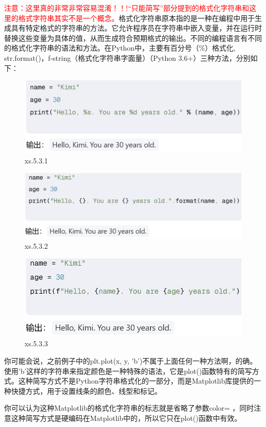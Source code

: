\documentclass[12pt]{article}
\begin{document}
\noindent \textcolor{red}{注意：这里真的非常非常容易混淆！！!“只能简写”部分提到的格式化字符串和这里的格式字符串其实不是一个概念。}格式化字符串原本指的是一种在编程中用于生成具有特定格式的字符串的方法。它允许程序员在字符串中嵌入变量，并在运行时替换这些变量为具体的值，从而生成符合预期格式的输出。不同的编程语言有不同的格式化字符串的语法和方法。在Python中，主要有百分号（\%）格式化, str.format()，f-string（格式化字符串字面量）（Python 3.6+）三种方法，分别如下：
\begin{figure}[H]
    \centering
    \includegraphics[width=0.75\linewidth]{格式化字符串1.png}
    \caption{xs.5.3.1}
    \label{fig:enter-label}
\end{figure}
\begin{figure}[H]
    \centering
    \includegraphics[width=0.75\linewidth]{格式化字符串2.png}
    \caption{xs.5.3.2}
    \label{fig:enter-label}
\end{figure}
\begin{figure}[H]
    \centering
    \includegraphics[width=0.75\linewidth]{格式化字符串3.png}
    \caption{xs.5.3.3}
    \label{fig:enter-label}
\end{figure}
你可能会说，之前例子中的plt.plot(x, y, 'b')不属于上面任何一种方法啊，的确。使用'b'这样的字符串来指定颜色是一种特殊的语法，它是plot()函数特有的简写方式。这种简写方式不是Python字符串格式化的一部分，而是Matplotlib库提供的一种快捷方式，用于设置线条的颜色、线型和标记。

你可以认为这种Matplotlib的格式化字符串的标志就是省略了参数color= ，同时注意这种简写方式是硬编码在Matplotlib中的，所以它只在plot()函数中有效。
\end{document}
